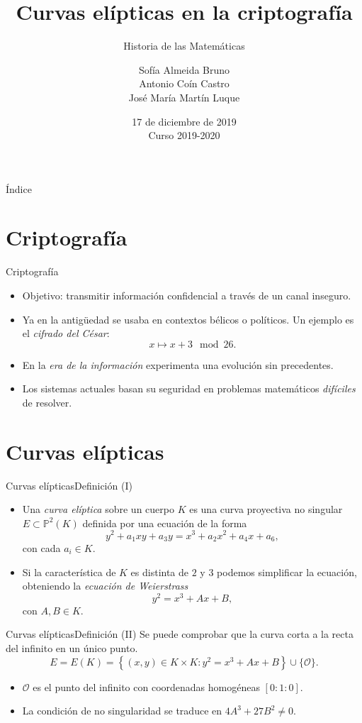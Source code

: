 \documentclass[spanish]{beamer}
\title{Curvas elípticas en la criptografía}
\subtitle{Historia de las Matemáticas}
\author{
  Sofía Almeida Bruno \texorpdfstring{\\}{} 
  Antonio Coín Castro \texorpdfstring{\\}{} 
  José María Martín Luque
}
\institute{\normalsize Universidad de Granada}
\date{17 de diciembre de 2019\texorpdfstring{\\}{} \small Curso 2019-2020}
\begin{document}
\maketitle

\begin{frame}{Índice}
  \tableofcontents
\end{frame}

\section{Criptografía}
\begin{frame}{Criptografía}
  \begin{itemize}
    \item Objetivo: transmitir información confidencial a través de un canal inseguro.
    \item Ya en la antigüedad se usaba en contextos bélicos o políticos. Un ejemplo es el \textit{cifrado del César}:
    \[x \mapsto x + 3 \mod 26.\]
    \item En la \textit{era de la información} experimenta una evolución sin precedentes.
    \item Los sistemas actuales basan su seguridad en problemas matemáticos \textit{difíciles} de resolver. 
  \end{itemize}
\end{frame}

\section{Curvas elípticas}
\begin{frame}{Curvas elípticas}{Definición (I)}
  \begin{itemize}
    \item Una \textit{curva elíptica} sobre un cuerpo $K$ es una curva proyectiva no singular $E \subset \mathbb{P}^2(K)$ definida por una ecuación de la forma
    \[ y^2 + a_1xy + a_3y = x^3 +a_2x^2 + a_4x + a_6,\]
    con cada \(a_i \in K\).
    \item Si la característica de \(K\) es distinta de \(2\) y \(3\) podemos simplificar la ecuación, obteniendo la \textit{ecuación de Weierstrass}
    \[y^2 = x^3 + Ax + B,\]
    con \(A, B \in K\).
  \end{itemize}
  
\end{frame}

\begin{frame}{Curvas elípticas}{Definición (II)}
  Se puede comprobar que la curva corta a la recta del infinito en un único punto.
  \[ E = E(K) = \left\{ (x, y) \in K \times K : y^2 = x^3 + Ax + B\right\} \cup \big\{\mathcal{O}\big\}.\]
  \begin{itemize}
    \item \(\mathcal O\) es el punto del infinito con coordenadas homogéneas \([0:1:0]\).
    \item La condición de no singularidad se traduce en \(4A^3 + 27B^2 \neq 0\).
  \end{itemize}
  
\end{frame}
\end{document}

